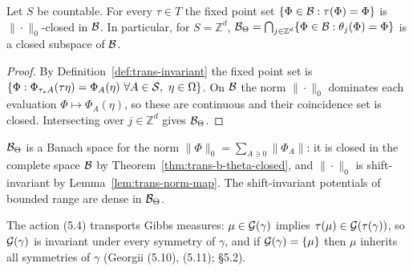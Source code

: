\begin{theorem}
    \label{thm:trans-b-theta-closed}
    \leanok

    Let $S$ be countable.  For every $\tau \in T$ the fixed point set
    $\{\Phi \in \mathcal{B} : \tau(\Phi) = \Phi\}$ is $\|\cdot\|_0$-closed in $\mathcal{B}$.  In
    particular, for $S = \mathbb{Z}^d$, $\mathcal{B}_\Theta = \bigcap_{j \in \mathbb{Z}^d}
    \{\Phi \in \mathcal{B} : \theta_j(\Phi) = \Phi\}$ is a closed subspace of $\mathcal{B}$.
\end{theorem}
\begin{proof}
    \leanok

    By Definition~\ref{def:trans-invariant} the fixed point set is
    $\{\Phi : \Phi_{\tau_* A}(\tau\eta) = \Phi_A(\eta)\ \forall A \in \mathcal{S},\ \eta \in \Omega\}$.
    On $\mathcal{B}$ the norm $\|\cdot\|_0$ dominates each evaluation $\Phi \mapsto \Phi_A(\eta)$,
    so these are continuous and their coincidence set is closed.  Intersecting over
    $j \in \mathbb{Z}^d$ gives $\mathcal{B}_\Theta$.
\end{proof}

\begin{remark}
    \label{rmk:trans-b-theta-banach}

    $\mathcal{B}_\Theta$ is a Banach space for the norm $\|\Phi\|_0 = \sum_{A \ni 0} \|\Phi_A\|$:
    it is closed in the complete space $\mathcal{B}$ by Theorem~\ref{thm:trans-b-theta-closed}, and
    $\|\cdot\|_0$ is shift-invariant by Lemma~\ref{lem:trans-norm-map}.  The shift-invariant
    potentials of bounded range are dense in $\mathcal{B}_\Theta$.
\end{remark}

\begin{remark}
    \label{rmk:trans-outlook}

    The action (5.4) transports Gibbs measures: $\mu \in \mathcal{G}(\gamma)$ implies
    $\tau(\mu) \in \mathcal{G}(\tau(\gamma))$, so $\mathcal{G}(\gamma)$ is invariant under every symmetry
    of $\gamma$, and if $\mathcal{G}(\gamma) = \{\mu\}$ then $\mu$ inherits all symmetries of
    $\gamma$ (Georgii (5.10), (5.11); §5.2).
\end{remark}
